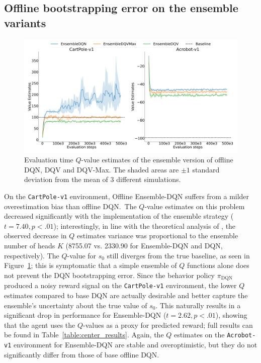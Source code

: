 \subsection{Offline bootstrapping error on the ensemble variants}
\begin{figure}[h]
  \centering
  \includegraphics[width=.9\textwidth]{img/dshift_plots_ensembles_qv.png}
  \caption{Evaluation time $Q$-value estimates of the ensemble version
    of offline DQN, DQV and DQV-Max. The shaded areas are $\pm 1$
    standard deviation from the mean of 3 different
    simulations.}\label{fig:dshift_offline_ensemble}
\end{figure}
On the \texttt{CartPole-v1} environment, Offline Ensemble-DQN suffers
from a milder overestimation bias than offline DQN.\ The $Q$-value
estimates on this problem decreased significantly with the
implementation of the ensemble strategy ($t=7.40,p<.01$);
interestingly, in
line with the theoretical analysis of \citet{anschel2017averaged}, the
observed decrease in $Q$ estimates variance was proportional to the
ensemble number of heads $K$ (8755.07 vs. 2330.90 for Ensemble-DQN and
DQN, respectively). The $Q$-value for $s_0$ still diverges from the
true baseline, as seen in Figure~\ref{fig:dshift_offline_ensemble};
this is symptomatic that a simple ensemble of $Q$ functions alone
does not prevent the DQN bootstrapping error. Since the behavior
policy $\pi_{\textrm{DQN}}$ produced a noisy reward signal on the
\texttt{CartPole-v1} environment, the lower $Q$ estimates compared to
base DQN are actually desirable and better capture the ensemble's
uncertainty about the true value of $s_0$. This naturally results in a
significant drop in performance for Ensemble-DQN ($t=2.62,p<.01$),
showing that the agent uses the $Q$-values as a proxy for predicted
reward; full results can be found in
Table~\ref{table:center_results}. Again, the $Q$
estimates on the \texttt{Acrobot-v1} environment for Ensemble-DQN are
stable and overoptimistic, but they do not significantly differ from
those of base offline DQN.\

